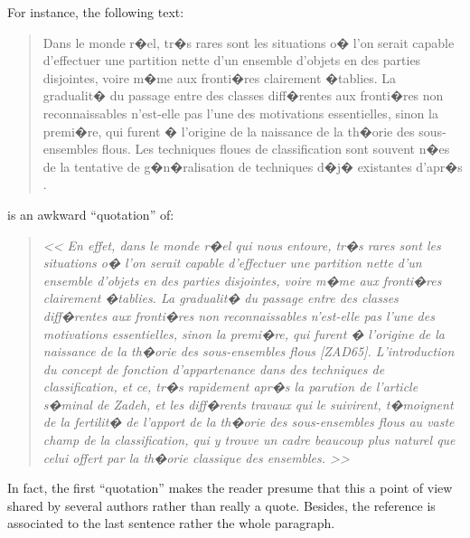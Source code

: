 For instance, the following text:
\begin{quote}
   Dans le monde r�el, tr�s rares sont les situations o� l'on serait capable d'effectuer une partition nette d'un ensemble d'objets en des parties disjointes, voire m�me aux fronti�res clairement �tablies. La gradualit� du passage entre des classes diff�rentes aux fronti�res non reconnaissables n'est-elle pas l'une des motivations essentielles, sinon la premi�re, qui furent � l'origine de la naissance de la th�orie des sous-ensembles flous. Les techniques floues de classification sont souvent n�es de la tentative de g�n�ralisation de techniques d�j� existantes d'apr�s \cite{Khodja-97}.
\end{quote}
is an awkward ``quotation'' of:
\begin{quote}
   \emph{<< En effet, dans le monde r�el qui nous entoure, tr�s rares sont les situations o� l'on serait capable d'effectuer une partition nette d'un ensemble d'objets en des parties disjointes, voire m�me aux fronti�res clairement �tablies. La gradualit� du passage entre des classes diff�rentes aux fronti�res non reconnaissables n'est-elle pas l'une des motivations essentielles, sinon la premi�re, qui furent � l'origine de la naissance de la th�orie des sous-ensembles flous [ZAD65]. L'introduction du concept de fonction d'appartenance dans des techniques de classification, et ce, tr�s rapidement apr�s la parution de l'article s�minal de Zadeh, et les diff�rents travaux qui le suivirent, t�moignent de la fertilit� de l'apport de la th�orie des sous-ensembles flous au vaste champ de la classification, qui y trouve un cadre beaucoup plus naturel que celui offert par la th�orie classique des ensembles. >>} \cite{Khodja-97}
\end{quote}

In fact, the first ``quotation'' makes the reader presume that this a point of view shared by several authors rather than really a quote.
Besides, the reference is associated to the last sentence rather the whole paragraph.

\bigskip

